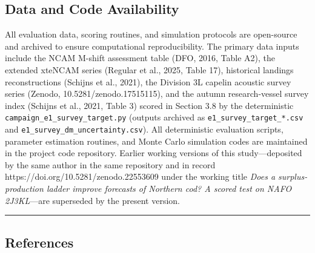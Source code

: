 \documentclass[11pt]{article}
\begin{document}
\subsection{Data and Code
Availability}\label{data-and-code-availability}

All evaluation data, scoring routines, and simulation protocols are
open-source and archived to ensure computational reproducibility. The
primary data inputs include the NCAM M-shift assessment table (DFO,
2016, Table A2), the extended xteNCAM series (Regular et al., 2025,
Table 17), historical landings reconstructions (Schijns et al., 2021),
the Division 3L capelin acoustic survey series (Zenodo,
10.5281/zenodo.17515115), and the autumn research-vessel survey index
(Schijns et al., 2021, Table 3) scored in Section 3.8 by the
deterministic \texttt{campaign\_e1\_survey\_target.py} (outputs archived
as \texttt{e1\_survey\_target\_*.csv} and
\texttt{e1\_survey\_dm\_uncertainty.csv}). All deterministic evaluation
scripts, parameter estimation routines, and Monte Carlo simulation codes
are maintained in the project code repository. Earlier working versions
of this study---deposited by the same author in the same repository and
in record https://doi.org/10.5281/zenodo.22553609 under the working
title \emph{Does a surplus-production ladder improve forecasts of
Northern cod? A scored test on NAFO 2J3KL}---are superseded by the
present version.

\begin{center}\rule{0.5\linewidth}{0.5pt}\end{center}

\subsection{References}\label{references}
\end{document}
